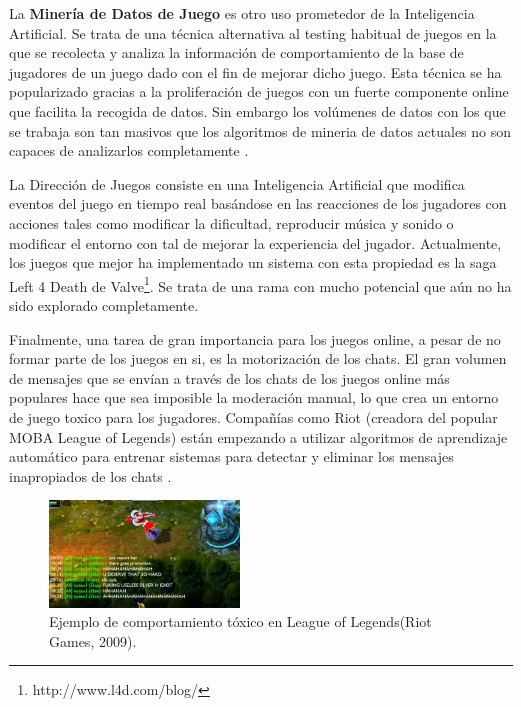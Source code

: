 La \textbf{Minería de Datos de Juego} es otro uso prometedor de la Inteligencia Artificial. Se trata de una técnica alternativa al testing habitual de juegos en la que se recolecta y analiza la información de comportamiento de la base de jugadores de un juego dado con el fin de mejorar dicho juego\cite{ai_revisited}. Esta técnica se ha popularizado gracias a la proliferación de juegos con un fuerte componente online que facilita la recogida de datos. Sin embargo los volúmenes de datos con los que se trabaja son tan masivos que los algoritmos de mineria de datos actuales no son capaces de analizarlos completamente \cite{ai_revisited}.

La Dirección de Juegos consiste en una Inteligencia Artificial que modifica eventos del juego en tiempo real basándose en las reacciones de los jugadores con acciones tales como modificar la dificultad, reproducir música y sonido o modificar el entorno con tal de mejorar la experiencia del jugador. Actualmente, los juegos que mejor ha implementado un sistema con esta propiedad es la saga Left 4 Death de Valve\footnote{http://www.l4d.com/blog/}. Se trata de una rama con mucho potencial que aún no ha sido explorado completamente.

Finalmente, una tarea de gran importancia para los juegos online, a pesar de no formar parte de los juegos en si, es la motorización de los chats. El gran volumen de mensajes que se envían a través de los chats de los juegos online más populares hace que sea imposible la moderación manual, lo que crea un entorno de juego toxico para los jugadores. Compañías como Riot (creadora del popular MOBA League of Legends) están empezando a utilizar algoritmos de aprendizaje automático para entrenar sistemas para detectar y eliminar los mensajes inapropiados de los chats \cite{toxic_wow}.

\begin{figure}[h]
	\includegraphics[width=0.45\textwidth]{images/estadodelarte/ai/lol-toxic-capture}
	\centering
	\caption{Ejemplo de comportamiento tóxico en League of Legends(Riot Games, 2009).}
\end{figure}

